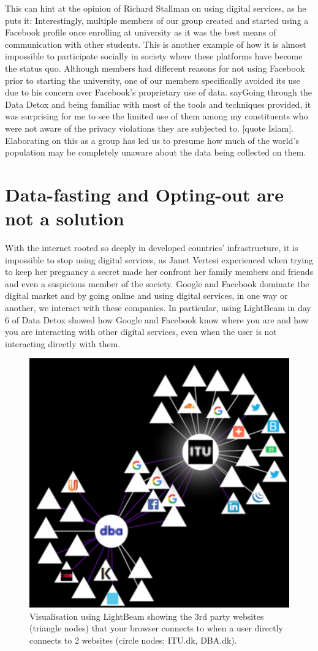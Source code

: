 \documentclass[format=acmsmall, review=false, screen=true]{acmart}
\begin{document}
This can hint at the opinion of Richard Stallman on using digital services, as he puts it: 
Interestingly, multiple members of our group created and started using a Facebook profile once enrolling at university as it was the best means of communication with other students. This is another example of how it is almost impossible to participate socially in society where these platforms have become the status quo. Although members had different reasons for not using Facebook prior to starting the university, one of our members specifically avoided its use due to his concern over Facebook's proprietary use of data. say{Going through the Data Detox and being familiar with most of the tools and techniques provided, it was surprising for me to see the limited use of them among my constituents who were not aware of the privacy violations they are subjected to.} [quote Islam]. Elaborating on this as a group has led us to presume how much of the world's population may be completely unaware about the data being collected on them.


\section{Data-fasting and Opting-out are not a solution}

With the internet rooted so deeply in developed countries’ infrastructure, it is impossible to stop using digital services, as Janet Vertesi experienced when trying to keep her pregnancy a secret made her confront her family members and friends and even a suspicious member of the society. Google and Facebook dominate the digital market and by going online and using digital services, in one way or another, we interact with these companies. In particular, using LightBeam in day 6 of Data Detox showed how Google and Facebook know where you are and how you are interacting with other digital services, even when the user is not interacting directly with them.

\begin{figure}[H]
  \includegraphics[width=0.46\linewidth]{lighbeam.PNG}
  \caption{Visualisation using LightBeam showing the 3rd party websites (triangle nodes) that your browser connects to when a user directly connects to 2 websites (circle nodes: ITU.dk, DBA.dk).}
  \label{fig:main-diagram}
\end{figure}
\end{document}
